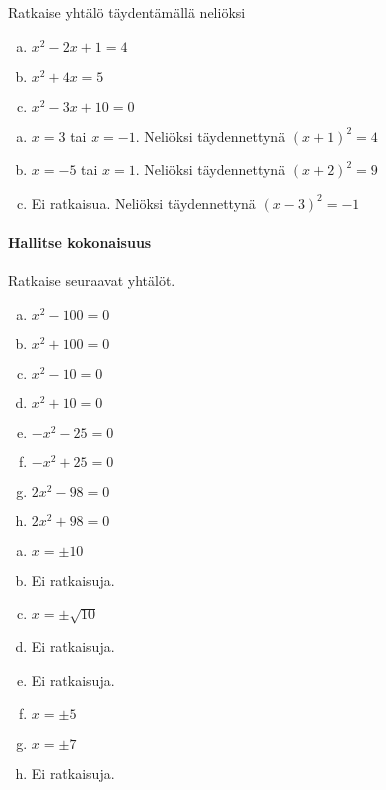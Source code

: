\begin{tehtava}
    Ratkaise yhtälö täydentämällä neliöksi
    \begin{enumerate}[a)]
        \item $x^2 -2x +1 = 4$
        \item $x^2 +4x = 5 $
        \item $x^2 -3x + 10 = 0 $
    \end{enumerate}
    \begin{vastaus}
        \begin{enumerate}[a)]
            \item $x = 3$ tai $x= -1$. Neliöksi täydennettynä $(x+1)^2=4$
            \item $x = -5$ tai $x = 1$. Neliöksi täydennettynä $(x+2)^2=9$
            \item Ei ratkaisua. Neliöksi täydennettynä $(x-3)^2=-1$   
        \end{enumerate}
    \end{vastaus}
\end{tehtava}

\paragraph*{Hallitse kokonaisuus}

\begin{tehtava}
    Ratkaise seuraavat yhtälöt.
    \begin{enumerate}[a)]
        \item $x^2 - 100 = 0$
        \item $x^2 + 100 = 0$
        \item $x^2 - 10 = 0$
        \item $x^2 + 10 = 0$
        \item $-x^2 - 25 = 0$
        \item $-x^2 + 25 = 0$
        \item $2x^2 - 98 = 0$
        \item $2x^2 + 98 = 0$
    \end{enumerate}
    \begin{vastaus}
        \begin{enumerate}[a)]
            \item $x=\pm10$
            \item Ei ratkaisuja.
            \item $x=\pm\sqrt{10}$
            \item Ei ratkaisuja.
            \item Ei ratkaisuja.
            \item $x=\pm5$
            \item $x=\pm7$
            \item Ei ratkaisuja.
        \end{enumerate}
    \end{vastaus}
\end{tehtava}

